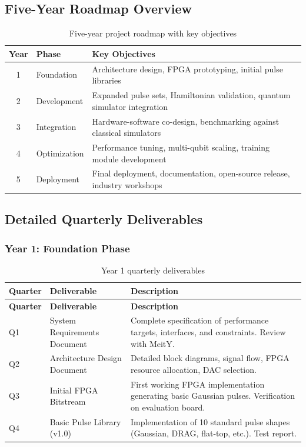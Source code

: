 \documentclass[12pt,a4paper]{article}
\theoremstyle{definition}
\begin{document}
\subsection{Five-Year Roadmap Overview}

\begin{table}[htbp]
\centering
\caption{Five-year project roadmap with key objectives}
\label{tab:roadmap}
\begin{tabular}{@{}clp{8cm}@{}}
\toprule
\textbf{Year} & \textbf{Phase} & \textbf{Key Objectives} \\
\midrule
1 & Foundation & Architecture design, FPGA prototyping, initial pulse libraries \\
2 & Development & Expanded pulse sets, Hamiltonian validation, quantum simulator integration \\
3 & Integration & Hardware-software co-design, benchmarking against classical simulators \\
4 & Optimization & Performance tuning, multi-qubit scaling, training module development \\
5 & Deployment & Final deployment, documentation, open-source release, industry workshops \\
\bottomrule
\end{tabular}
\end{table}

\subsection{Detailed Quarterly Deliverables}

\subsubsection{Year 1: Foundation Phase}

\begin{longtable}{@{}p{1.5cm}p{4cm}p{7cm}@{}}
\caption{Year 1 quarterly deliverables} \label{tab:year1} \\
\toprule
\textbf{Quarter} & \textbf{Deliverable} & \textbf{Description} \\
\midrule
\endfirsthead
\toprule
\textbf{Quarter} & \textbf{Deliverable} & \textbf{Description} \\
\midrule
\endhead
Q1 & System Requirements Document & Complete specification of performance targets, interfaces, and constraints. Review with MeitY. \\
\midrule
Q2 & Architecture Design Document & Detailed block diagrams, signal flow, FPGA resource allocation, DAC selection. \\
\midrule
Q3 & Initial FPGA Bitstream & First working FPGA implementation generating basic Gaussian pulses. Verification on evaluation board. \\
\midrule
Q4 & Basic Pulse Library (v1.0) & Implementation of 10 standard pulse shapes (Gaussian, DRAG, flat-top, etc.). Test report. \\
\bottomrule
\end{longtable}
\end{document}
